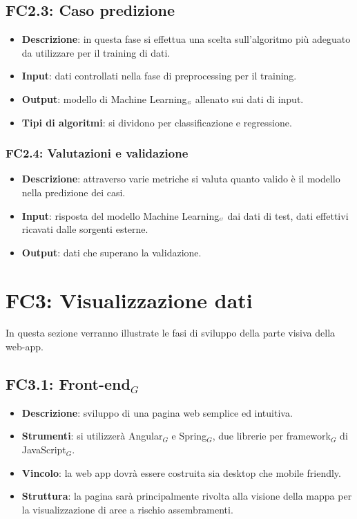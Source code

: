 \subsection{FC2.3: Caso predizione}\label{fasiProgettoElaborazioneDatiCasoPredizione}

\begin{itemize}
	\item \textbf{Descrizione}: in questa fase si effettua una scelta sull'algoritmo più adeguato da utilizzare per il training di dati.
	\item \textbf{Input}: dati controllati nella fase di preprocessing per il training.
	\item \textbf{Output}: modello di Machine Learning$_{\scaleto{G}{3pt}}$ allenato sui dati di input.
	\item \textbf{Tipi di algoritmi}: si dividono per classificazione e regressione.%
\end{itemize}

\subsubsection{FC2.4: Valutazioni e validazione}\label{fasiProgettoElaborazioneDatiValutazioniValidazione}

\begin{itemize}
	\item \textbf{Descrizione}: attraverso varie metriche si valuta quanto valido è il modello nella predizione dei casi.
	\item \textbf{Input}: risposta del modello Machine Learning$_{\scaleto{G}{3pt}}$ dai dati di test, dati effettivi ricavati dalle sorgenti esterne.
	\item \textbf{Output}: dati che superano la validazione.
\end{itemize}

\section{FC3: Visualizzazione dati}\label{fasiProgettoVisualizzazioneDati}
In questa sezione verranno illustrate le fasi di sviluppo della parte visiva della web-app.

\subsection{FC3.1: Front-end$_G$}\label{fasiProgettoVisualizzazioneDatiFrontEnd}

\begin{itemize}
	\item \textbf{Descrizione}: sviluppo di una pagina web semplice ed intuitiva.
	\item \textbf{Strumenti}: si utilizzerà Angular$_G$ e Spring$_G$, due librerie per framework$_G$ di JavaScript$_G$.
	\item \textbf{Vincolo}: la web app dovrà essere costruita sia desktop che mobile friendly. 
	\item \textbf{Struttura}: la pagina sarà principalmente rivolta alla visione della mappa per la visualizzazione di aree a rischio assembramenti.
\end{itemize}

